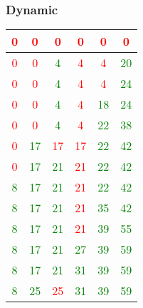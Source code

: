 \documentclass[12]{beamer}
\begin{document}
\begin{frame}
\frametitle{Dynamic}

\begin{center}
\begin{adjustbox}{max width=\textwidth}
\small
\begin{tabular}{ |c|c|c|c|c|c|}
\hline
 \textcolor{red}{0} & \textcolor{red}{0} & \textcolor{red}{0} & \textcolor{red}{0} & \textcolor{red}{0} & \textcolor{red}{0}\\ 
\hline
 \textcolor{red}{0} & \textcolor{red}{0} & \textcolor{green}{4} & \textcolor{red}{4} & \textcolor{red}{4} & \textcolor{green}{20}\\ 
\hline
 \textcolor{red}{0} & \textcolor{red}{0} & \textcolor{green}{4} & \textcolor{red}{4} & \textcolor{red}{4} & \textcolor{green}{24}\\ 
\hline
 \textcolor{red}{0} & \textcolor{red}{0} & \textcolor{green}{4} & \textcolor{red}{4} & \textcolor{green}{18} & \textcolor{green}{24}\\ 
\hline
 \textcolor{red}{0} & \textcolor{red}{0} & \textcolor{green}{4} & \textcolor{red}{4} & \textcolor{green}{22} & \textcolor{green}{38}\\ 
\hline
 \textcolor{red}{0} & \textcolor{green}{17} & \textcolor{red}{17} & \textcolor{red}{17} & \textcolor{green}{22} & \textcolor{green}{42}\\ 
\hline
 \textcolor{red}{0} & \textcolor{green}{17} & \textcolor{green}{21} & \textcolor{red}{21} & \textcolor{green}{22} & \textcolor{green}{42}\\ 
\hline
 \textcolor{green}{8} & \textcolor{green}{17} & \textcolor{green}{21} & \textcolor{red}{21} & \textcolor{green}{22} & \textcolor{green}{42}\\ 
\hline
 \textcolor{green}{8} & \textcolor{green}{17} & \textcolor{green}{21} & \textcolor{red}{21} & \textcolor{green}{35} & \textcolor{green}{42}\\ 
\hline
 \textcolor{green}{8} & \textcolor{green}{17} & \textcolor{green}{21} & \textcolor{red}{21} & \textcolor{green}{39} & \textcolor{green}{55}\\ 
\hline
 \textcolor{green}{8} & \textcolor{green}{17} & \textcolor{green}{21} & \textcolor{green}{27} & \textcolor{green}{39} & \textcolor{green}{59}\\ 
\hline
 \textcolor{green}{8} & \textcolor{green}{17} & \textcolor{green}{21} & \textcolor{green}{31} & \textcolor{green}{39} & \textcolor{green}{59}\\ 
\hline
 \textcolor{green}{8} & \textcolor{green}{25} & \textcolor{red}{25} & \textcolor{green}{31} & \textcolor{green}{39} & \textcolor{green}{59}\\ 

\end{tabular}
\end{adjustbox}
\end{center}
\end{frame}
\end{document}
